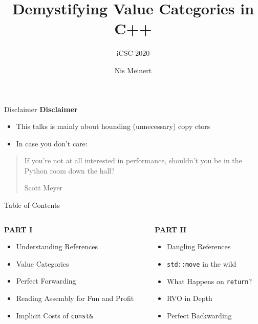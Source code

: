 \documentclass[compress,aspectratio=1610]{beamer}
\title{Demystifying Value Categories in C++}
\subtitle{iCSC 2020}
\institute{Rostock University}
\author{Nis Meinert}
\date{}
\begin{document}
\maketitle

\begin{frame}{Disclaimer}
    \textbf{Disclaimer} 
    \begin{itemize}
        \item This talks is mainly about hounding (unnecessary) copy ctors
        \item In case you don't care:
    \end{itemize}

    \blockquote[Scott Meyer]{If you’re not at all interested in performance, shouldn’t you be in the Python room down the hall?}
\end{frame}

\begin{frame}{Table of Contents}
    \begin{columns}[t]
        \begin{column}{.4\textwidth}
            \textbf{PART I}
            \begin{itemize}
                \item Understanding References
                \item Value Categories
                \item Perfect Forwarding
                \item Reading Assembly for Fun and Profit
                \item Implicit Costs of \texttt{const\&}
            \end{itemize}
        \end{column}
        \begin{column}{.4\textwidth}
            \textbf{PART II}
            \begin{itemize}
                \item Dangling References
                \item \texttt{std::move} in the wild
                \item What Happens on \texttt{return}?
                \item RVO in Depth
                \item Perfect Backwarding
            \end{itemize}
        \end{column}
    \end{columns}
\end{frame}

\begin{frame}
    \centering
    \scalebox{5}{PART I}
\end{frame}


\begin{frame}
    \centering
    \scalebox{5}{PART II}
\end{frame}

\end{document}
